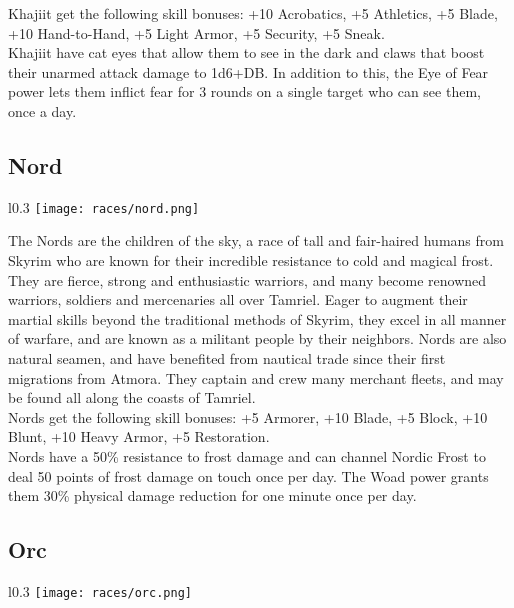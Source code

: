 Khajiit get the following skill bonuses: +10 Acrobatics, +5 Athletics, +5 Blade, +10 Hand-to-Hand, +5 Light Armor, +5 Security, +5 Sneak.\\

Khajiit have cat eyes that allow them to see in the dark and claws that boost their unarmed attack damage to 1d6+DB. In addition to this, the Eye of Fear power lets them inflict fear for 3 rounds on a single target who can see them, once a day.

\subsection{Nord}
\begin{wrapfigure}{l}{0.3\textwidth}
	\texttt{[image: races/nord.png]}
\end{wrapfigure}

The Nords are the children of the sky, a race of tall and fair-haired humans from Skyrim who are known for their incredible resistance to cold and magical frost. They are fierce, strong and enthusiastic warriors, and many become renowned warriors, soldiers and mercenaries all over Tamriel. Eager to augment their martial skills beyond the traditional methods of Skyrim, they excel in all manner of warfare, and are known as a militant people by their neighbors. Nords are also natural seamen, and have benefited from nautical trade since their first migrations from Atmora. They captain and crew many merchant fleets, and may be found all along the coasts of Tamriel.\\

Nords get the following skill bonuses: +5 Armorer, +10 Blade, +5 Block, +10 Blunt, +10 Heavy Armor, +5 Restoration.\\

Nords have a 50\% resistance to frost damage and can channel Nordic Frost to deal 50 points of frost damage on touch once per day. The Woad power grants them 30\% physical damage reduction for one minute once per day.

\subsection{Orc}
\begin{wrapfigure}{l}{0.3\textwidth}
	\texttt{[image: races/orc.png]}
\end{wrapfigure}

